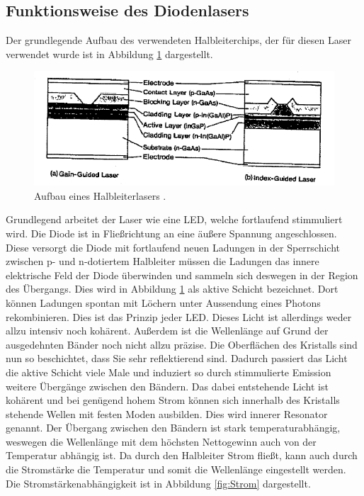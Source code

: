 \subsection{Funktionsweise des Diodenlasers}
Der grundlegende Aufbau des verwendeten Halbleiterchips, der für diesen Laser verwendet wurde ist in Abbildung \ref{fig:Chip} dargestellt.
\begin{figure}[H]
    \centering
    \includegraphics[scale=0.8]{pictures/Chip.png}
    \caption{Aufbau eines Halbleiterlasers \cite{teachspin}.}
    \label{fig:Chip}
\end{figure}
\noindent Grundlegend arbeitet der Laser wie eine LED, welche fortlaufend stimmuliert wird. Die Diode ist in Fließrichtung 
an eine äußere Spannung angeschlossen. Diese versorgt die Diode mit fortlaufend neuen Ladungen in der Sperrschicht 
zwischen p- und n-dotiertem Halbleiter müssen die Ladungen das innere elektrische Feld der Diode überwinden und sammeln sich deswegen in der Region des Übergangs.
Dies wird in Abbildung  \ref{fig:Chip} als aktive Schicht bezeichnet. Dort können Ladungen spontan mit Löchern unter Aussendung eines Photons rekombinieren.
Dies ist das Prinzip jeder LED. Dieses Licht ist allerdings weder allzu intensiv noch kohärent. Außerdem ist die Wellenlänge auf Grund der ausgedehnten Bänder 
noch nicht allzu präzise. Die Oberflächen des Kristalls sind nun so beschichtet, dass Sie sehr reflektierend sind. Dadurch passiert das Licht die aktive Schicht viele 
Male und induziert so durch stimmulierte Emission weitere Übergänge zwischen den Bändern. Das dabei entstehende Licht ist kohärent und bei genügend hohem Strom können sich 
innerhalb des Kristalls stehende Wellen mit festen Moden ausbilden. Dies wird innerer Resonator genannt.
Der Übergang zwischen den Bändern ist stark temperaturabhängig, weswegen die Wellenlänge mit dem höchsten Nettogewinn auch von der Temperatur abhängig ist.
Da durch den Halbleiter Strom fließt, kann auch durch die Stromstärke die Temperatur und somit die Wellenlänge eingestellt werden. 
Die Stromstärkenabhängigkeit ist in Abbildung \ref{fig:Strom} dargestellt.

